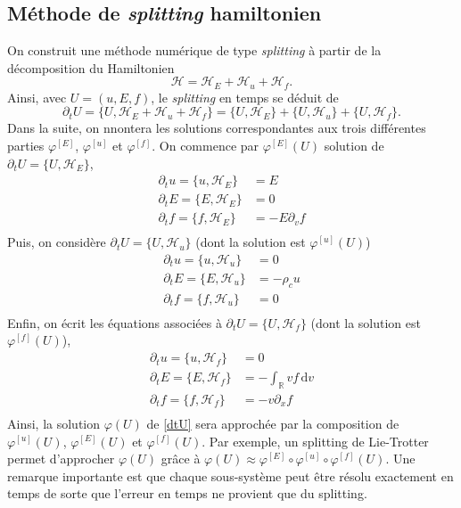 \subsection{Méthode de \emph{splitting} hamiltonien}\label{ssec:splitting}

On construit une méthode numérique de type \emph{splitting} à partir de la décomposition du Hamiltonien
$$
  \mathcal{H} = \mathcal{H}_E +\mathcal{H}_u + \mathcal{H}_f. 
$$
Ainsi, avec $U=(u, E, f)$, le \emph{splitting} en temps se déduit de 
\begin{equation}
\label{dtU}
  \partial_t U = \{ U, \mathcal{H}_E +\mathcal{H}_u + \mathcal{H}_f \} = \{ U, \mathcal{H}_E  \}+\{ U, \mathcal{H}_u  \}+\{ U,  \mathcal{H}_f \}.
\end{equation}
Dans la suite, on nnontera les solutions correspondantes aux trois différentes parties $\varphi^{[E]}$, $\varphi^{[u]}$ et $\varphi^{[f]}$. On commence par  $\varphi^{[E]}(U)$ solution de $\partial_t U = \{ U, \mathcal{H}_E  \}$,  
\begin{equation}
  \begin{aligned}
    \partial_t u = \{ u, \mathcal{H}_E \} &= E \\
    \partial_t E = \{ E, \mathcal{H}_E \} &=  0 \\
    \partial_t f = \{ f, \mathcal{H}_E \} &=  -E\partial_v f \\
  \end{aligned}
  \label{eq:varphi:E}
\end{equation}
Puis, on considère  $\partial_t U = \{ U, \mathcal{H}_u  \}$ (dont la solution est $\varphi^{[u]}(U)$)
\begin{equation}
  \begin{aligned}
    \partial_t u = \{ u, \mathcal{H}_u \} &=  0 \\
    \partial_t E = \{ E, \mathcal{H}_u \} &=  - \rho_c u \\
    \partial_t f = \{ f, \mathcal{H}_u \} &=  0 \\
  \end{aligned}
  \label{eq:varphi:u}
\end{equation}
Enfin, on écrit les équations associées à  $\partial_t U = \{ U, \mathcal{H}_f  \}$ (dont la solution est $\varphi^{[f]}(U)$), 
\begin{equation}
  \begin{aligned}
    \partial_t u = \{ u, \mathcal{H}_f \} &=  0 \\
    \partial_t E = \{ E, \mathcal{H}_f \} &=  - \int_{\mathbb{R}} vf\,\mathrm{d}{v} \\
    \partial_t f = \{ f, \mathcal{H}_f \} &=  -v\partial_x f \\
  \end{aligned}
  \label{eq:varphi:f}
\end{equation}
Ainsi, la solution $\varphi(U)$ de \eqref{dtU} sera approchée par la composition de $\varphi^{[u]}(U)$, $\varphi^{[E]}(U)$ et $\varphi^{[f]}(U)$. Par exemple, un splitting de Lie-Trotter permet d'approcher $\varphi(U)$ grâce à $\varphi(U)\approx \varphi^{[E]}\circ  \varphi^{[u]}\circ  \varphi^{[f]}(U)$. Une remarque importante est que chaque sous-système peut être résolu exactement en temps de sorte que l'erreur en temps ne provient que du splitting.  

